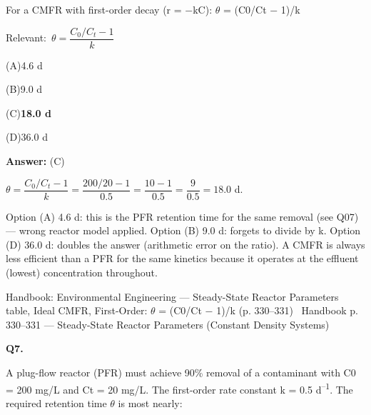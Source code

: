 \documentclass[11pt]{article}
\newcommand{\correct}[1]{\textbf{#1}\;{\color{accent}$\checkmark$}}
\newcommand{\optline}[2]{\par\noindent\hspace{1.2em}(#1)\hspace{0.6em}#2}
\begin{document}
For a CMFR with first-order decay (r = $-$kC): $\theta$ = (C0/Ct $-$ 1)/k\par\vspace{3pt}
{\small\color{soft}Relevant:}\ $\theta = \dfrac{C_0/C_t - 1}{k}$\par\vspace{3pt}
\optline{A}{4.6 d}
\optline{B}{9.0 d}
\optline{C}{\correct{18.0 d}}
\optline{D}{36.0 d}
\par\vspace{3pt}
\vspace{2pt}\par\noindent\colorbox{boxbg}{\parbox{\dimexpr\linewidth-2\fboxsep\relax}{%
\vspace{2pt}\textbf{Answer:} (C)\par\vspace{2pt}
{\small $\theta = \dfrac{C_0/C_t - 1}{k} = \dfrac{200/20 - 1}{0.5} = \dfrac{10 - 1}{0.5} = \dfrac{9}{0.5} = 18.0$ d.

Option (A) 4.6 d: this is the PFR retention time for the same removal (see Q07) --- wrong reactor model applied. Option (B) 9.0 d: forgets to divide by k. Option (D) 36.0 d: doubles the answer (arithmetic error on the ratio). A CMFR is always less efficient than a PFR for the same kinetics because it operates at the effluent (lowest) concentration throughout.}\par\vspace{2pt}
{\footnotesize\color{soft}Handbook: Environmental Engineering --- Steady-State Reactor Parameters table, Ideal CMFR, First-Order: $\theta$ = (C0/Ct $-$ 1)/k (p. 330--331) \textbullet\ Handbook p. 330--331 --- Steady-State Reactor Parameters (Constant Density Systems)}\vspace{2pt}
}}
\vspace{9pt}
\filbreak
\textbf{\color{accent}Q7.}\par\vspace{2pt}
A plug-flow reactor (PFR) must achieve 90\% removal of a contaminant with C0 = 200 mg/L and Ct = 20 mg/L. The first-order rate constant k = 0.5 d\textsuperscript{--}\textsuperscript{1}. The required retention time $\theta$ is most nearly:
\end{document}
